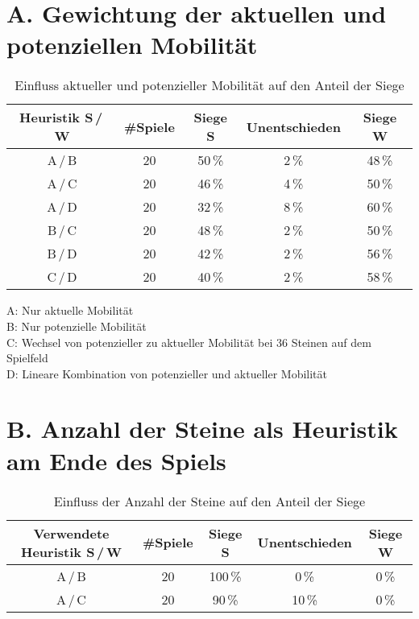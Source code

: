 
\addchap{\langanhang}

\section*{A. Gewichtung der aktuellen und potenziellen Mobilität}
 
\setcounter{table}{0}
\renewcommand{\thetable}{A\arabic{table}}

\begin{table}[hb]
\centering
\begin{tabular}{c|c|ccc}
\hline
Heuristik S\,/\,W & \#Spiele & Siege S & Unentschieden & Siege W \\
\hline
 A\,/\,B & 20 & 50\,\% &  2\,\% & 48\,\% \\
 A\,/\,C & 20 & 46\,\% &  4\,\% & 50\,\% \\
 A\,/\,D & 20 & 32\,\% &  8\,\% & 60\,\% \\
 B\,/\,C & 20 & 48\,\% &  2\,\% & 50\,\% \\
 B\,/\,D & 20 & 42\,\% &  2\,\% & 56\,\% \\
 C\,/\,D & 20 & 40\,\% &  2\,\% & 58\,\% \\
\hline
\end{tabular}
\caption{Einfluss aktueller und potenzieller Mobilität auf den Anteil der Siege}
\label{table:mobility}
\end{table}

\small{
A: Nur aktuelle Mobilität \\
B: Nur potenzielle Mobilität \\
C: Wechsel von potenzieller zu aktueller Mobilität bei 36 Steinen auf dem Spielfeld \\
D: Lineare Kombination von potenzieller und aktueller Mobilität}

\pagebreak

\section*{B. Anzahl der Steine als Heuristik am Ende des Spiels}
 
\setcounter{table}{0}
\renewcommand{\thetable}{B\arabic{table}}

\begin{table}[hb]
\centering
\begin{tabular}{c|c|ccc}
\hline
Verwendete Heuristik S\,/\,W & \#Spiele & Siege S & Unentschieden & Siege W \\
\hline
 A\,/\,B & 20 &100\,\% &  0\,\% & 0\,\% \\
 A\,/\,C & 20 & 90\,\% & 10\,\% & 0\,\% \\
\hline
\end{tabular}
\caption{Einfluss der Anzahl der Steine auf den Anteil der Siege}
\label{table:disccount}
\end{table}

